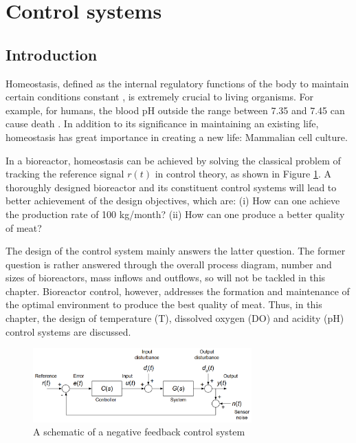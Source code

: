 \newpage
\section{Control systems}
\vspace{-3mm}
\subsection{Introduction}
\vspace{-3mm}



Homeostasis, defined as the internal regulatory functions of the body to maintain certain conditions constant \cite{E-Guyton2006, E-Aging2022}, is extremely crucial to living organisms. For example, for humans, the blood pH outside the range between 7.35 and 7.45 can cause death \cite{E-Donaldson2013}. In addition to its significance in maintaining an existing life, homeostasis has great importance in creating a new life: Mammalian cell culture.

In a bioreactor, homeostasis can be achieved by solving the classical problem of tracking the reference signal $r(t)$ in control theory, as shown in Figure \ref{figure:E-1-1-control-system}. A thoroughly designed bioreactor and its constituent control systems will lead to better achievement of the design objectives, which are: (i) How can one achieve the production rate of 100 kg/month? (ii) How can one produce a better quality of meat?

The design of the control system mainly answers the latter question. The former question is rather answered through the overall process diagram, number and sizes of bioreactors, mass inflows and outflows, so will not be tackled in this chapter. Bioreactor control, however, addresses the formation and maintenance of the optimal environment to produce the best quality of meat. Thus, in this chapter, the design of temperature (T), dissolved oxygen (DO) and acidity (pH) control systems are discussed.

\begin{figure}[h]
    \centering
    \includegraphics[width=0.75\textwidth]{E-1-1-control-system.png}
    \hfill
    \caption{A schematic of a negative feedback control system \cite{E-Cannon2022}}
    \label{figure:E-1-1-control-system}
\end{figure}

